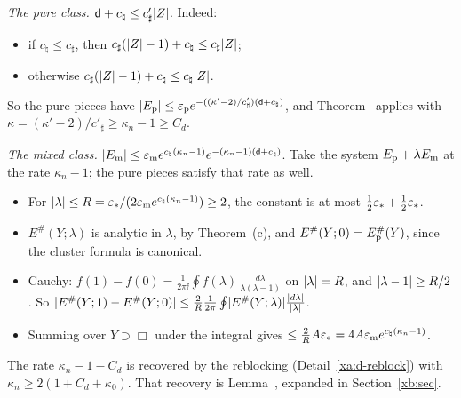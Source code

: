 \begin{detail}\label{xa:d-twoclass}
\emph{The pure class.} $\mathsf d+c_\natural\le c'_\sharp\lvert Z\rvert$. Indeed:
\begin{itemize}
\item if $c_\natural\le c_\sharp$, then $c_\sharp(\lvert Z\rvert-1)+c_\natural\le c_\sharp\lvert Z\rvert$;
\item otherwise $c_\sharp(\lvert Z\rvert-1)+c_\natural\le c_\natural\lvert Z\rvert$.
\end{itemize}
So the pure pieces have $\lvert E_{\rm p}\rvert\le\varepsilon_{\rm p}e^{-((\kappa'-2)/c'_\sharp)(\mathsf d+c_\natural)}$, and Theorem~ applies with $\kappa=(\kappa'-2)/c'_\sharp\ge\kappa_n-1\ge C_d$.

\emph{The mixed class.} $\lvert E_{\rm m}\rvert\le\varepsilon_{\rm m}e^{c_\natural(\kappa_n-1)}e^{-(\kappa_n-1)(\mathsf d+c_\natural)}$. Take the system $E_{\rm p}+\lambda E_{\rm m}$ at the rate $\kappa_n-1$; the pure pieces satisfy that rate as well.
\begin{itemize}
\item For $\lvert\lambda\rvert\le R=\varepsilon_*/(2\varepsilon_{\rm m}e^{c_\natural(\kappa_n-1)})\ge2$, the constant is at most $\frac12\varepsilon_*+\frac12\varepsilon_*$.
\item $E^\#(Y;\lambda)$ is analytic in $\lambda$, by Theorem~(c), and $E^\#(Y;0)=E^\#_{\rm p}(Y)$, since the cluster formula is canonical.
\item Cauchy: $f(1)-f(0)=\frac1{2\pi\ii}\oint f(\lambda)\,\frac{d\lambda}{\lambda(\lambda-1)}$ on $\lvert\lambda\rvert=R$, and $\lvert\lambda-1\rvert\ge R/2$. So $\lvert E^\#(Y;1)-E^\#(Y;0)\rvert\le\frac2R\frac1{2\pi}\oint\lvert E^\#(Y;\lambda)\rvert\frac{\lvert d\lambda\rvert}{\lvert\lambda\rvert}$.
\item Summing over $Y\supset\Box$ under the integral gives $\le\frac2RA\varepsilon_*=4A\varepsilon_{\rm m}e^{c_\natural(\kappa_n-1)}$.
\end{itemize}
The rate $\kappa_n-1-C_d$ is recovered by the reblocking (Detail~\ref{xa:d-reblock}) with $\kappa_n\ge2(1+C_d+\kappa_0)$. That recovery is Lemma~, expanded in Section~\ref{xb:sec}.
\end{detail}

